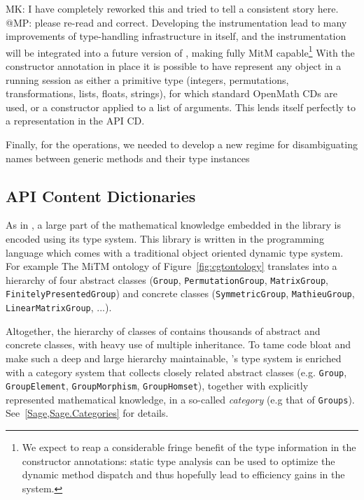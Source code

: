 \begin{newpart}{MK: I have completely reworked this and tried to tell a consistent story
    here. @MP: please re-read and correct.}
Developing the instrumentation lead to many improvements of type-handling infrastructure
in \GAP itself, and the instrumentation will be integrated into a future version of \GAP,
making \GAP fully MitM capable\footnote{We expect to reap a considerable fringe benefit of
  the type information in the constructor annotations: static type analysis can be used to
  optimize the dynamic method dispatch and thus hopefully lead to efficiency gains in the
  system.} With the constructor
annotation in place it is possible to have \GAP represent any object in a running session
as either a primitive type (integers, permutations, transformations, lists, floats,
strings), for which standard OpenMath CDs are used, or a constructor applied to a list of
arguments. This lends itself perfectly to a representation in the \GAP API CD.
 
Finally, for the \GAP operations, we needed to develop a new regime for disambiguating
names between generic methods and their type instances

\end{newpart}

\subsection{\Sage API Content Dictionaries}

As in \GAP, a large part of the mathematical knowledge embedded in the
\Sage library is encoded using its type system. This library is
written in the \Python programming language which comes with a
traditional object oriented dynamic type system.
For example The MiTM ontology of Figure~\ref{fig:cgtontology}
translates into a hierarchy of four abstract classes (\texttt{Group},
\texttt{PermutationGroup}, \texttt{MatrixGroup},
\texttt{FinitelyPresentedGroup}) and concrete classes
(\texttt{SymmetricGroup}, \texttt{MathieuGroup},
\texttt{LinearMatrixGroup}, ...).

Altogether, the hierarchy of classes of \Sage contains thousands of
abstract and concrete classes, with heavy use of multiple inheritance.
To tame code bloat and make such a deep and large hierarchy
maintainable, \Python's type system is enriched with a category system
that collects closely related abstract classes (e.g. \texttt{Group},
\texttt{GroupElement}, \texttt{GroupMorphism}, \texttt{GroupHomset}),
together with explicitly represented mathematical knowledge, in a
so-called \emph{category} (e.g that of \texttt{Groups}).
See~\ref{Sage,Sage.Categories} for details.

